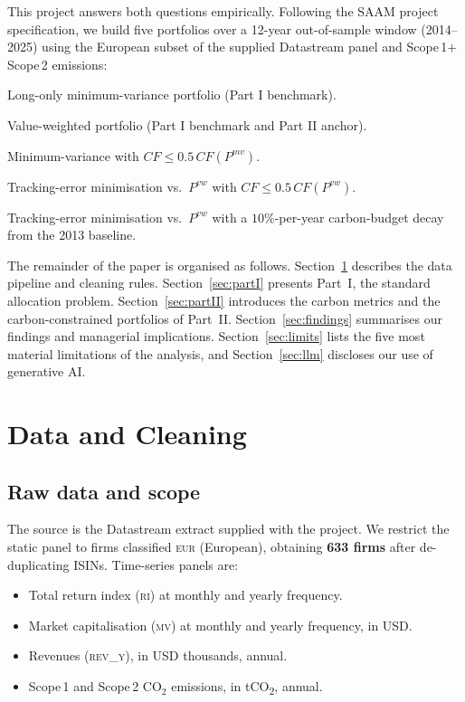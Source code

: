 \documentclass[11pt,a4paper]{article}
\begin{document}
This project answers both questions empirically. Following the SAAM
project specification, we build five portfolios over a 12-year
out-of-sample window (2014--2025) using the European subset of the supplied
Datastream panel and Scope\,1$+$Scope\,2 emissions:

\begin{description}[leftmargin=2.6cm,style=nextline]
  \item[$P^{mv}$] Long-only minimum-variance portfolio (Part I benchmark).
  \item[$P^{vw}$] Value-weighted portfolio (Part I benchmark and Part II anchor).
  \item[$P^{mv}(0.5)$] Minimum-variance with $CF \le 0.5\,CF(P^{mv})$.
  \item[$P^{vw}(0.5)$] Tracking-error minimisation vs.\ $P^{vw}$ with $CF \le 0.5\,CF(P^{vw})$.
  \item[$P^{vw}(NZ)$] Tracking-error minimisation vs.\ $P^{vw}$ with a $10\%$-per-year carbon-budget decay from the 2013 baseline.
\end{description}

The remainder of the paper is organised as follows.
Section~\ref{sec:data} describes the data pipeline and cleaning rules.
Section~\ref{sec:partI} presents Part~I, the standard allocation problem.
Section~\ref{sec:partII} introduces the carbon metrics and the
carbon-constrained portfolios of Part~II.
Section~\ref{sec:findings} summarises our findings and managerial
implications.
Section~\ref{sec:limits} lists the five most material limitations of the
analysis, and Section~\ref{sec:llm} discloses our use of generative AI.

\section{Data and Cleaning}\label{sec:data}

\subsection{Raw data and scope}
The source is the Datastream extract supplied with the project. We restrict
the static panel to firms classified \textsc{eur} (European), obtaining
\textbf{633 firms} after de-duplicating ISINs. Time-series panels are:

\begin{itemize}[leftmargin=*]
  \item Total return index (\textsc{ri}) at monthly and yearly frequency.
  \item Market capitalisation (\textsc{mv}) at monthly and yearly frequency, in USD.
  \item Revenues (\textsc{rev\_y}), in USD thousands, annual.
  \item Scope\,1 and Scope\,2 CO$_2$ emissions, in \si{tCO_2}, annual.
\end{itemize}
\end{document}
